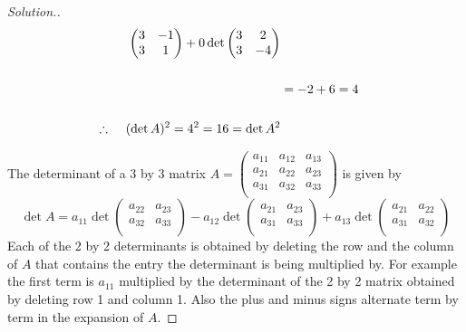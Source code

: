 \documentclass[11pt,a4paper]{article}
\theoremstyle{definition}
\newenvironment{solution}
  {\renewcommand{\qedsymbol}{}\begin{proof}[\textit{Solution}.]}
  {\end{proof}}
\begin{document}
\begin{solution}
\begin{align*}
\begin{pmatrix}
3&-1\\3&1\\
\end{pmatrix}
+0\det
\begin{pmatrix}
3&2\\3&-4\\
\end{pmatrix}
\\\\
&=-2+6=4\\\\
\therefore\hspace{0.4cm} (\det A)^2=4^2=16=\det A^2\\
\end{align*}

The determinant of a 3 by 3 matrix $A=
\begin{pmatrix}
a_{11}&a_{12}&a_{13}\\a_{21}&a_{22}&a_{23}\\a_{31}&a_{32}&a_{33}\\
\end{pmatrix}
$ is given by $$\det A=a_{11}\det
\begin{pmatrix}
a_{22}&a_{23}\\a_{32}&a_{33}\\
\end{pmatrix}
-a_{12}\det
\begin{pmatrix}
a_{21}&a_{23}\\a_{31}&a_{33}\\
\end{pmatrix}
+a_{13}\det
\begin{pmatrix}
a_{21}&a_{22}\\a_{31}&a_{32}\\
\end{pmatrix}
$$
Each of the 2 by 2 determinants is obtained by deleting the row and the column of $A$ that contains the entry the determinant is being multiplied by. For example the first term is $a_{11}$ multiplied by the determinant of the 2 by 2 matrix obtained by deleting row 1 and column 1. Also the plus and minus signs alternate term by term in the expansion of $A$.


\end{solution}
\end{document}
